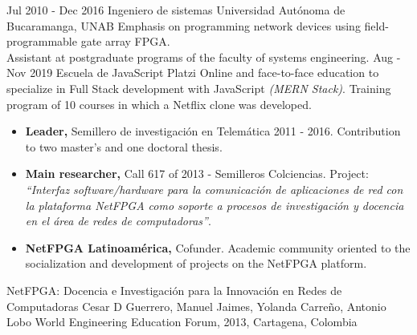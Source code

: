\documentclass[9pt]{developercv}
\begin{document}
	\vspace{-\baselineskip}
	
	\begin{entrylist}
		\entry
		{Jul 2010 - Dec 2016}
		{Ingeniero de sistemas}
		{Universidad Autónoma de Bucaramanga, UNAB}
		{	Emphasis on programming network devices using field-programmable gate array FPGA.\\
			Assistant at postgraduate programs of the faculty of systems engineering.
		}
		\entry
		{Aug - Nov 2019}
		{Escuela de JavaScript}
		{Platzi}
		{Online and face-to-face education to specialize in Full Stack development with JavaScript \textit{(MERN Stack)}. Training program of 10 courses in which a Netflix clone was developed.}		
	\end{entrylist}
	\vspace{-\baselineskip}
	
	\begin{minipage}{\textwidth}
		
		\begin{itemize}[noitemsep,nolistsep,leftmargin=*]
			\item \textbf{Leader,} Semillero de investigación en Telemática 2011 - 2016. Contribution to two master's and one doctoral thesis.
			\item \textbf{Main researcher,} Call 617 of 2013 - Semilleros Colciencias. Project: \textit{“Interfaz software/hardware para la comunicación de aplicaciones de red con la plataforma NetFPGA como soporte a procesos de investigación y docencia en el área de redes de computadoras”}.
			\item \textbf{NetFPGA Latinoamérica,} Cofunder. Academic community oriented to the socialization and development of projects on the NetFPGA platform.
		\end{itemize}
	\end{minipage}

	\begin{minipage}{\textwidth}
	
	NetFPGA: Docencia e Investigación para la Innovación en Redes de Computadoras Cesar D Guerrero, Manuel Jaimes, Yolanda Carreño, Antonio Lobo World Engineering Education Forum, 2013, Cartagena, Colombia
	\end{minipage}
	
\end{document}
